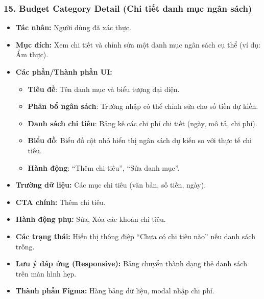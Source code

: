 \documentclass[11pt,a4paper]{article}
\begin{document}
\subsubsection{15. Budget Category Detail (Chi tiết danh mục ngân sách)}
\begin{itemize}
    \item \textbf{Tác nhân:} Người dùng đã xác thực.
    \item \textbf{Mục đích:} Xem chi tiết và chỉnh sửa một danh mục ngân sách cụ thể (ví dụ: Ẩm thực).
    \item \textbf{Các phần/Thành phần UI:}
    \begin{itemize}
        \item \textbf{Tiêu đề}: Tên danh mục và biểu tượng đại diện.
        \item \textbf{Phân bổ ngân sách}: Trường nhập có thể chỉnh sửa cho số tiền dự kiến.
        \item \textbf{Danh sách chi tiêu}: Bảng kê các chi phí chi tiết (ngày, mô tả, chi phí).
        \item \textbf{Biểu đồ}: Biểu đồ cột nhỏ hiển thị ngân sách dự kiến so với thực tế chi tiêu.
        \item \textbf{Hành động}: ``Thêm chi tiêu'', ``Sửa danh mục''.
    \end{itemize}
    \item \textbf{Trường dữ liệu:} Các mục chi tiêu (văn bản, số tiền, ngày).
    \item \textbf{CTA chính:} Thêm chi tiêu.
    \item \textbf{Hành động phụ:} Sửa, Xóa các khoản chi tiêu.
    \item \textbf{Các trạng thái:} Hiển thị thông điệp ``Chưa có chi tiêu nào'' nếu danh sách trống.
    \item \textbf{Lưu ý đáp ứng (Responsive):} Bảng chuyển thành dạng thẻ danh sách trên màn hình hẹp.
    \item \textbf{Thành phần Figma:} Hàng bảng dữ liệu, modal nhập chi phí.
\end{itemize}
\end{document}
